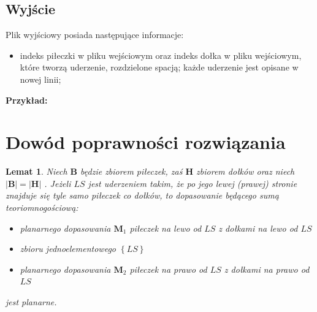 \documentclass[10pt,a4paper]{article}
\newtheorem{lemma}{Lemat}
\begin{document}
	\subsection{Wyjście}
	
	Plik wyjściowy posiada następujące informacje:
	\begin{itemize}
		\item indeks piłeczki w pliku wejściowym oraz indeks dołka w pliku wejściowym, które tworzą uderzenie, rozdzielone spacją; każde uderzenie jest opisane w nowej linii;
	\end{itemize}
	
	\textbf{Przykład:} 
	
	\section{Dowód poprawności rozwiązania}
	
	\begin{lemma}\label{lemma:1}
		Niech $\mathbf{B}$ będzie zbiorem piłeczek, zaś $\mathbf{H}$ zbiorem dołków oraz niech $|\mathbf{B}| = |\mathbf{H}|$ . Jeżeli $LS$ jest uderzeniem takim, że po jego lewej (prawej) stronie znajduje się tyle samo piłeczek co dołków, to dopasowanie będącego sumą teoriomnogościową:
		\begin{itemize}
			\item planarnego dopasowania $\mathbf{M}_{1}$ piłeczek na lewo od $LS$ z dołkami na lewo od $LS$
			\item zbioru jednoelementowego $\left\{LS\right\}$
			\item planarnego dopasowania $\mathbf{M}_{2}$ piłeczek na prawo od $LS$ z dołkami na prawo od $LS$
		\end{itemize}
		jest planarne.
	\end{lemma}
\end{document}

